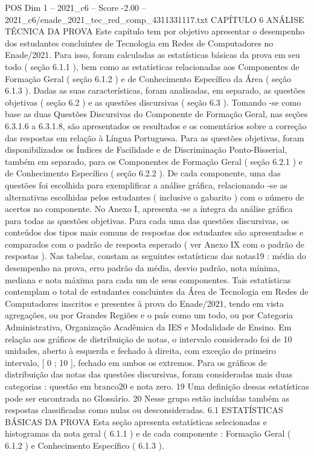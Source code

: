 \begin{textsample}{POS Dim 1 – 2021\_c6 – Score -2.00 – 2021\_c6/enade\_2021\_tec\_red\_comp\_4311331117.txt}  \label{ex:f1_pos_209}
CAPÍTULO 6 ANÁLISE TÉCNICA DA PROVA Este capítulo tem por objetivo apresentar o desempenho dos estudantes concluintes de Tecnologia em Redes de Computadores no Enade/2021.
Para isso, foram calculadas as estatísticas básicas da prova em seu todo ( seção 6.1.1 ), bem como as estatísticas relacionadas aos Componentes de Formação Geral ( seção 6.1.2 ) e de Conhecimento Específico da Área ( seção 6.1.3 ).
Dadas as suas características, foram analisadas, em separado, as questões objetivas ( seção 6.2 ) e as questões discursivas ( seção 6.3 ).
Tomando -se como base as duas Questões Discursivas do Componente de Formação Geral, nas seções 6.3.1.6 a 6.3.1.8, são apresentados os resultados e os comentários sobre a correção das respostas em relação à Língua Portuguesa.
Para as questões objetivas, foram disponibilizados os Índices de Facilidade e de Discriminação Ponto-Bisserial, também em separado, para os Componentes de Formação Geral ( seção 6.2.1 ) e de Conhecimento Específico ( seção 6.2.2 ).
De cada componente, uma das questões foi escolhida para exemplificar a análise gráfica, relacionando -se as alternativas escolhidas pelos estudantes ( inclusive o gabarito ) com o número de acertos no componente.
No Anexo I, apresenta -se a íntegra da análise gráfica para todas as questões objetivas.
Para cada uma das questões discursivas, os conteúdos dos tipos mais comuns de respostas dos estudantes são apresentados e comparados com o padrão de resposta esperado ( ver Anexo IX com o padrão de respostas ).
Nas tabelas, constam as seguintes estatísticas das notas19 : média do desempenho na prova, erro padrão da média, desvio padrão, nota mínima, mediana e nota máxima para cada um de seus componentes.
Tais estatísticas contemplam o total de estudantes concluintes da Área de Tecnologia em Redes de Computadores inscritos e presentes à prova do Enade/2021, tendo em vista agregações, ou por Grandes Regiões e o país como um todo, ou por Categoria Administrativa, Organização Acadêmica da IES e Modalidade de Ensino.
Em relação aos gráficos de distribuição de notas, o intervalo considerado foi de 10 unidades, aberto à esquerda e fechado à direita, com exceção do primeiro intervalo, [ 0 ; 10 ], fechado em ambos os extremos.
Para os gráficos de distribuição das notas das questões discursivas, foram consideradas mais duas categorias : questão em branco20 e nota zero. 19 Uma definição dessas estatísticas pode ser encontrada no Glossário. 20 Nesse grupo estão incluídas também as respostas classificadas como nulas ou desconsideradas. 6.1 ESTATÍSTICAS BÁSICAS DA PROVA Esta seção apresenta estatísticas selecionadas e histogramas da nota geral ( 6.1.1 ) e de cada componente : Formação Geral ( 6.1.2 ) e Conhecimento Específico ( 6.1.3 ).

\end{textsample}
